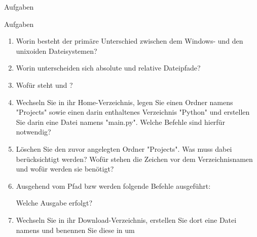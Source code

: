     \begin{subsection}{Aufgaben}
        
        \begin{frame}[allowframebreaks]{Aufgaben}
            \begin{enumerate}
            
                \item Worin besteht der primäre Unterschied zwischen dem Windows- und den unixoiden Dateisystemen?
                \item Worin unterscheiden sich absolute und relative Dateipfade?
                \item Wofür steht  und ?
                \item Wechseln Sie in ihr Home-Verzeichnis, legen Sie einen Ordner namens "Projects" sowie einen darin enthaltenes Verzeichnis "Python" und erstellen Sie darin eine Datei namens "main.py". Welche Befehle sind hierfür notwendig?
                
                \item Löschen Sie den zuvor angelegten Ordner "Projects". Was muss dabei berücksichtigt werden? Wofür stehen die Zeichen vor dem Verzeichnisnamen und wofür werden sie benötigt?
                
                \framebreak
                
                \item Ausgehend vom Pfad  bzw  werden folgende Befehle ausgeführt:
                
                
                
                
                
                Welche Ausgabe erfolgt?
                
                \item Wechseln Sie in ihr Download-Verzeichnis, erstellen Sie dort eine Datei namens  und benennen Sie diese in  um
            \end{enumerate}
        \end{frame}    
    
    \end{subsection}